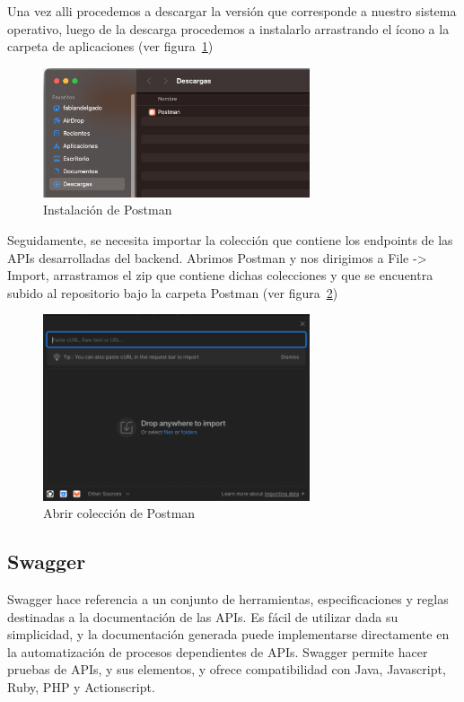 Una vez alli procedemos a descargar la versión que corresponde a nuestro sistema operativo, luego de la descarga procedemos a instalarlo arrastrando el ícono a la carpeta de aplicaciones
(ver figura~\ref{Img:Instalación+de+Postman})

\begin{figure}[h]
    \centering
    \includegraphics[width=0.7\textwidth]{img/manual/postman-instalar.png}
    \caption{Instalación de Postman} \label{Img:Instalación+de+Postman}
\end{figure} 

Seguidamente, se necesita importar la colección que contiene los endpoints de las APIs desarrolladas del backend. Abrimos Postman y nos dirigimos a File -> Import, arrastramos el zip que contiene dichas colecciones y que se encuentra subido al repositorio bajo la carpeta Postman (ver figura~\ref{Img:Abrir+colección+de+Postman})


\begin{figure}[h]
    \centering
    \includegraphics[width=0.7\textwidth]{img/manual/abrir-coleccion-postman.png}
    \caption{Abrir colección de Postman} \label{Img:Abrir+colección+de+Postman}
\end{figure} 

\subsection{Swagger}\label{swagger}
Swagger hace referencia a un conjunto de herramientas, especificaciones y reglas destinadas a la documentación de las APIs. Es fácil de utilizar dada su simplicidad, y la documentación generada puede implementarse directamente en la automatización de procesos dependientes de APIs. Swagger permite hacer pruebas de APIs, y sus elementos, y ofrece compatibilidad con Java, Javascript, Ruby, PHP y Actionscript.

